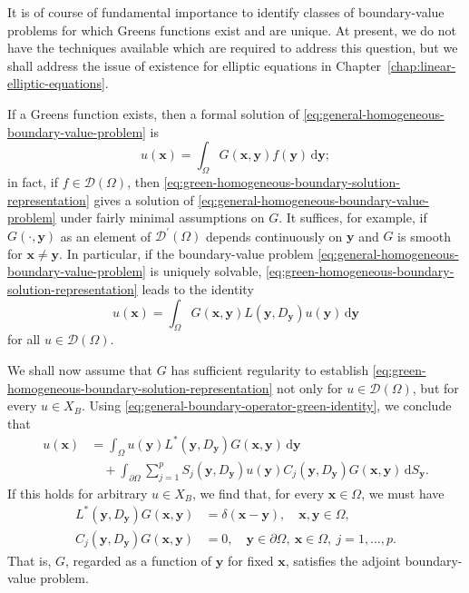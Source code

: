 It is of course of fundamental importance to identify classes of boundary-value problems for which Green\textquotesingle s functions exist and are unique. At present, we do not have the techniques available which are required to address this question, but we shall address the issue of existence for elliptic equations in Chapter~\ref{chap:linear-elliptic-equations}.

If a Green\textquotesingle s function exists, then a formal solution of \eqref{eq:general-homogeneous-boundary-value-problem} is
\begin{equation}\label{eq:green-homogeneous-boundary-solution-representation}
u(\bm{x})=\int_\Omega G(\bm{x},\bm{y})f(\bm{y})\,\mathrm{d}\bm{y};
\end{equation}
in fact, if $f\in\mathcal{D}(\Omega)$, then \eqref{eq:green-homogeneous-boundary-solution-representation} gives a solution of \eqref{eq:general-homogeneous-boundary-value-problem} under fairly minimal assumptions on $G$. It suffices, for example, if $G(\cdot,\bm{y})$ as an element of $\mathcal{D}^{\prime}(\Omega)$ depends continuously on $\bm{y}$ and $G$ is smooth for $\bm{x}\ne\bm{y}$. In particular, if the boundary-value problem \eqref{eq:general-homogeneous-boundary-value-problem} is uniquely solvable, \eqref{eq:green-homogeneous-boundary-solution-representation} leads to the identity
\begin{equation}\label{eq:green-test-function-representation-identity}
u(\bm{x})=\int_\Omega G(\bm{x},\bm{y})L(\bm{y},D_{\bm{y}})u(\bm{y})\,\mathrm{d}\bm{y}
\end{equation}
for all $u\in\mathcal{D}(\Omega)$.

We shall now assume that $G$ has sufficient regularity to establish \eqref{eq:green-homogeneous-boundary-solution-representation} not only for $u\in\mathcal{D}(\Omega)$, but for every $u\in X_B$. Using \eqref{eq:general-boundary-operator-green-identity}, we conclude that
\begin{equation}\label{eq:green-adjoint-kernel-boundary-derivation}
\begin{aligned}
u(\bm{x})&=\int_\Omega u(\bm{y})L^*(\bm{y},D_{\bm{y}})G(\bm{x},\bm{y})\,\mathrm{d}\bm{y}\\
&\quad+\int_{\partial\Omega}\sum_{j=1}^p S_j(\bm{y},D_{\bm{y}})u(\bm{y})C_j(\bm{y},D_{\bm{y}})G(\bm{x},\bm{y})\,\mathrm{d}S_{\bm{y}}.
\end{aligned}
\end{equation}
If this holds for arbitrary $u\in X_B$, we find that, for every $\bm{x}\in\Omega$, we must have
\begin{equation}\label{eq:green-kernel-adjoint-variable-problem}
\begin{aligned}
L^*(\bm{y},D_{\bm{y}})G(\bm{x},\bm{y})&=\delta(\bm{x}-\bm{y}),\quad\bm{x},\bm{y}\in\Omega,\\
C_j(\bm{y},D_{\bm{y}})G(\bm{x},\bm{y})&=0,\quad\bm{y}\in\partial\Omega,\ \bm{x}\in\Omega,\ j=1,\ldots,p.
\end{aligned}
\end{equation}
That is, $G$, regarded as a function of $\bm{y}$ for fixed $\bm{x}$, satisfies the adjoint boundary-value problem.

